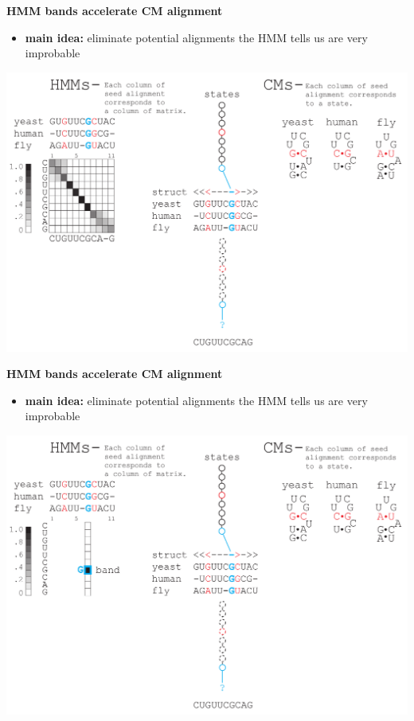 \documentclass[landscape]{slides}
\begin{document}
\begin{slide}
\begin{center}

\textbf{HMM bands accelerate CM alignment}
\end{center}
\medskip
\small
\begin{itemize}
\item
\textbf{main idea:} eliminate potential alignments the HMM tells us are very improbable
\end{itemize}
\begin{center}
\includegraphics[width=8in]{figs/post_hmm_to_cm_map2_layer11}
\end{center}
\vfill
\end{slide}
\begin{slide}
\begin{center}

\textbf{HMM bands accelerate CM alignment}
\end{center}
\medskip
\small
\begin{itemize}
\item
\textbf{main idea:} eliminate potential alignments the HMM tells us are very improbable
\end{itemize}
\begin{center}
\includegraphics[width=8in]{figs/post_hmm_to_cm_map2_layer12}
\end{center}
\vfill
\end{slide}
\end{document}
